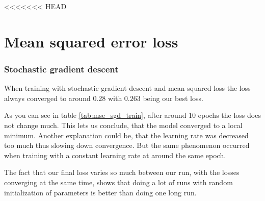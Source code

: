 <<<<<<< HEAD
\\
\section{Mean squared error loss}
\subsubsection{Stochastic gradient descent}
When training with stochastic gradient descent and mean
squared loss the loss always converged to around $0.28$
with $0.263$ being our best loss.

As you can see in table \ref*{tab:mse_sgd_train}, after around 10 epochs
the loss does not change much.
This lets us conclude, that the model converged to a local minimum. Another explanation
could be, that the learning rate was decreased too much thus slowing down convergence.
But the same phenomenon occurred when training with a constant learning rate at around
the same epoch.

The fact that our final loss varies so much between our run, with the losses
converging at the same time, shows that doing a lot of runs with random
initialization of parameters is better than doing one long run.


